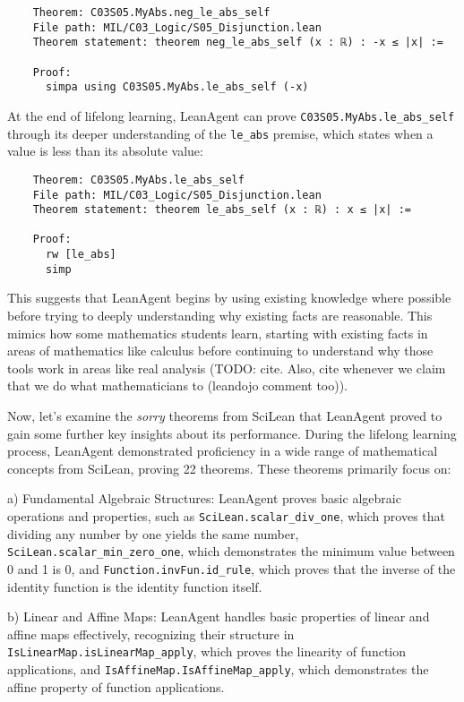 \documentclass{article} %
\begin{document}
\begin{verbatim}
    Theorem: C03S05.MyAbs.neg_le_abs_self
    File path: MIL/C03_Logic/S05_Disjunction.lean
    Theorem statement: theorem neg_le_abs_self (x : ℝ) : -x ≤ |x| :=
    
    Proof:
      simpa using C03S05.MyAbs.le_abs_self (-x)
\end{verbatim}

At the end of lifelong learning, LeanAgent can prove \texttt{C03S05.MyAbs.le\_abs\_self} through its deeper understanding of the \texttt{le\_abs} premise, which states when a value is less than its absolute value:

\begin{verbatim}
    Theorem: C03S05.MyAbs.le_abs_self
    File path: MIL/C03_Logic/S05_Disjunction.lean
    Theorem statement: theorem le_abs_self (x : ℝ) : x ≤ |x| :=
    
    Proof:
      rw [le_abs]
      simp
\end{verbatim}

This suggests that LeanAgent begins by using existing knowledge where possible before trying to deeply understanding why existing facts are reasonable. This mimics how some mathematics students learn, starting with existing facts in areas of mathematics like calculus before continuing to understand why those tools work in areas like real analysis (TODO: cite. Also, cite whenever we claim that we do what mathematicians to (leandojo comment too)).

Now, let's examine the \textit{sorry} theorems from SciLean that LeanAgent proved to gain some further key insights about its performance. During the lifelong learning process, LeanAgent demonstrated proficiency in a wide range of mathematical concepts from SciLean, proving 22 theorems. These theorems primarily focus on:

a) Fundamental Algebraic Structures:
LeanAgent proves basic algebraic operations and properties, such as \texttt{SciLean.scalar\_div\_one}, which proves that dividing any number by one yields the same number, \texttt{SciLean.scalar\_min\_zero\_one}, which demonstrates the minimum value between 0 and 1 is 0, and \texttt{Function.invFun.id\_rule}, which proves that the inverse of the identity function is the identity function itself.

b) Linear and Affine Maps:
LeanAgent handles basic properties of linear and affine maps effectively, recognizing their structure in \texttt{IsLinearMap.isLinearMap\_apply}, which proves the linearity of function applications, and \texttt{IsAffineMap.IsAffineMap\_apply}, which demonstrates the affine property of function applications.
\end{document}
